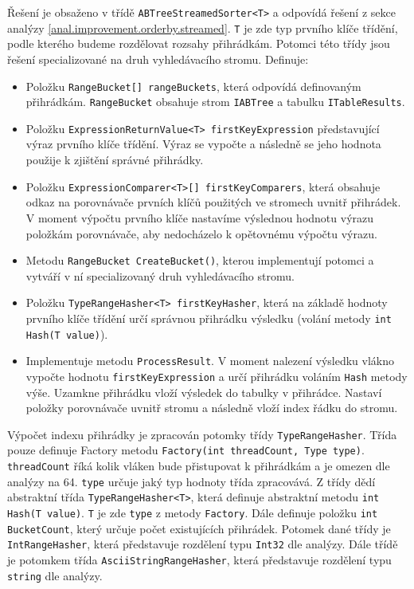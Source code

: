 Řešení je obsaženo v třídě \texttt{ABTreeStreamedSorter<T>} a odpovídá řešení z sekce analýzy \ref{anal.improvement.orderby.streamed}.
\texttt{T} je zde typ prvního klíče třídění, podle kterého budeme rozdělovat rozsahy přihrádkám.
Potomci této třídy jsou řešení specializované na druh vyhledávacího stromu.
Definuje:
\begin{itemize}
\item Položku \texttt{RangeBucket[] rangeBuckets}, která odpovídá definovaným přihrádkám.
\texttt{RangeBucket} obsahuje strom \texttt{IABTree} a tabulku \texttt{ITableResults}.
\item Položku \texttt{ExpressionReturnValue<T> firstKeyExpression} představující výraz prvního klíče třídění.
Výraz se vypočte a následně se jeho hodnota použije k zjištění správné přihrádky.
\item Položku \texttt{ExpressionComparer<T>[] firstKeyComparers}, která obsahuje odkaz na porovnávače prvních klíčů použitých ve stromech uvnitř přihrádek.
V moment výpočtu prvního klíče nastavíme výslednou hodnotu výrazu položkám porovnávače, aby nedocházelo k opětovnému výpočtu výrazu.
\item Metodu \texttt{RangeBucket CreateBucket()}, kterou implementují potomci a vytváří v ní specializovaný druh vyhledávacího stromu.
\item Položku \texttt{TypeRangeHasher<T> firstKeyHasher}, která na základě hodnoty prvního klíče třídění určí správnou přihrádku výsledku (volání metody \texttt{int Hash(T value)}).
\item Implementuje metodu \texttt{ProcessResult}.
V moment nalezení výsledku vlákno vypočte hodnotu \texttt{firstKeyExpression} a určí přihrádku voláním \texttt{Hash} metody výše.
Uzamkne přihrádku vloží výsledek do tabulky v přihrádce.
Nastaví položky porovnávače uvnitř stromu a následně vloží index řádku do stromu. 
\end{itemize}
Výpočet indexu přihrádky je zpracován potomky třídy \texttt{TypeRangeHasher}.
Třída pouze definuje Factory metodu \citep[str. 107]{patterns} \texttt{Factory(int threadCount, Type type)}.
\texttt{threadCount} říká kolik vláken bude přistupovat k přihrádkám a je omezen dle analýzy na 64.
\texttt{type} určuje jaký typ hodnoty třída zpracovává.
Z třídy dědí abstraktní třída \texttt{TypeRangeHasher<T>}, která definuje abstraktní metodu \texttt{int Hash(T value)}.
\texttt{T} je zde \texttt{type} z metody \texttt{Factory}.
Dále definuje položku \texttt{int BucketCount}, který určuje počet existujících přihrádek.
Potomek dané třídy je \texttt{IntRangeHasher}, která představuje rozdělení typu \texttt{Int32} dle analýzy.
Dále třídě je potomkem třída \texttt{AsciiStringRangeHasher}, která představuje rozdělení typu \texttt{string} dle analýzy.

